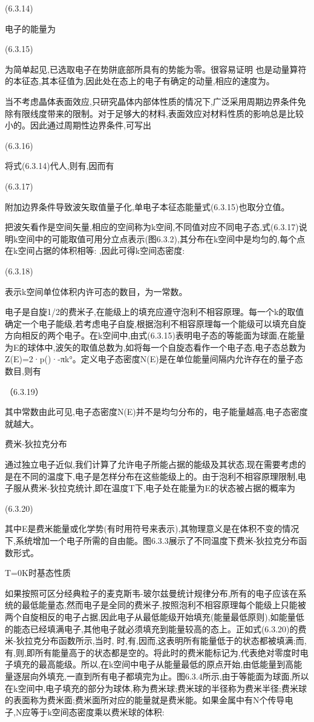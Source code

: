  	(6.3.14)



电子的能量为

 	(6.3.15)

为简单起见,已选取电子在势阱底部所具有的势能为零。很容易证明 也是动量算符的本征态,其本征值为,因此处在态上的电子有确定的动量,相应的速度为。

当不考虑晶体表面效应,只研究晶体内部体性质的情况下,广泛采用周期边界条件免除有限线度带来的限制。对于足够大的材料,表面效应对材料性质的影响总是比较小的。因此通过周期性边界条件,可写出

 	(6.3.16)

将式(6.3.14)代人,则有,因而有

	 (6.3.17)

附加边界条件导致波矢取值量子化,单电子本征态能量式(6.3.15)也取分立值。

把波矢看作是空间矢量,相应的空间称为k空间,不同值对应不同电子态,式(6.3.17)说明k空间中的可能取值可用分立点表示(图6.3.2),其分布在k空间中是均匀的,每个点在k空间占据的体积相等: ,因此可得k空间态密度:

 	(6.3.18)



表示k空间单位体积内许可态的数目，为一常数。

电子是自旋1/2的费米子,在能级上的填充应遵守泡利不相容原理。每一个k的取值确定一个电子能级,若考虑电子自旋,根据泡利不相容原理每一个能级可以填充自旋方向相反的两个电子。在k空间中,由式(6.3.15)表明电子态的等能面为球面,在能量为E的球体中,波矢的取值总数为,如将每一个自旋态看作一个电子态,电子态总数为Z(E)=2·p()·-πk°。定义电子态密度N(E)是在单位能量间隔内允许存在的量子态数目,则有

	（6.3.19）

其中常数由此可见,电子态密度N(E)并不是均匀分布的，电子能量越高,电子态密度就越大。

费米-狄拉克分布

通过独立电子近似,我们计算了允许电子所能占据的能级及其状态,现在需要考虑的是在不同的温度下,电子是怎样分布在这些能级上的。由于泡利不相容原理限制,电子服从费米-狄拉克统计,即在温度T下,电子处在能量为E的状态被占据的概率为

 	(6.3.20)

其中E是费米能量或化学势(有时用符号来表示),其物理意义是在体积不变的情况下,系统增加一个电子所需的自由能。图6.3.3展示了不同温度下费米-狄拉克分布函数形式。





T=0K时基态性质

如果按照可区分经典粒子的麦克斯韦-玻尔兹曼统计规律分布,所有的电子应该在系统的最低能量态,然而电子是全同的费米子,按照泡利不相容原理每个能级上只能被两个自旋相反的电子占据,因此电子从最低能级开始填充(能量最低原则),如能量低的能态已经填满电子,其他电子就必须填充到能量较高的态上。正如式(6.3.20)的费米-狄拉克分布函数所示,当时, 时,有,因而,这表明所有能量低于的状态都被填满;而,有,则,即所有能量高于的状态都是空的。将此时的费米能标记为,代表绝对零度时电子填充的最高能级。所以,在k空间中电子从能量最低的原点开始,由低能量到高能量逐层向外填充,一直到所有电子都填完为止。图6.3.4所示,由于等能面为球面,所以在k空间中,电子填充的部分为球体,称为费米球;费米球的半径称为费米半径;费米球的表面称为费米面;费米面所对应的能量就是费米能。如果金属中有N个传导电子,N应等于k空间态密度乘以费米球的体积:


